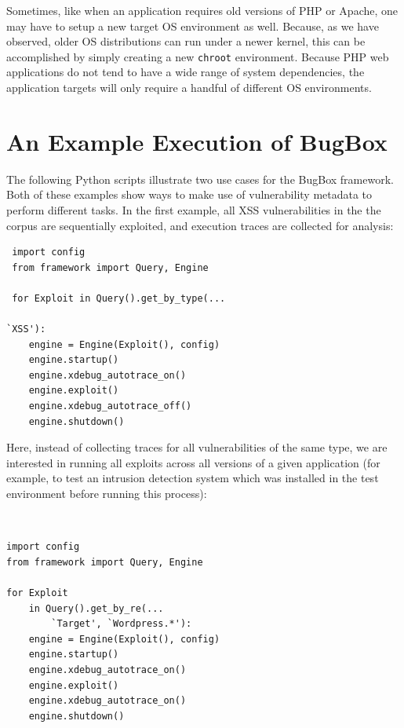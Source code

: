 \documentclass[letterpaper,twocolumn,10pt]{article}
\begin{document}
Sometimes, like when an application requires old versions of PHP or Apache, one may have to setup a new target OS environment as well. Because, as we have observed, older OS distributions can run under a newer kernel, this can be accomplished by simply creating a new \texttt{chroot} environment. Because PHP web applications do not tend to have a wide range of system dependencies, the application targets will only require a handful of different OS environments. \par

\section {An Example Execution of BugBox}

The following Python scripts illustrate two use cases for the BugBox framework. Both of these examples show ways to make use of vulnerability metadata to perform different tasks. In the first example, all XSS vulnerabilities in the the corpus are sequentially exploited, and execution traces are collected for analysis:

\begin{minipage}{\textwidth}
{\tt \footnotesize

\begin{lstlisting}
 import config
 from framework import Query, Engine
 
 for Exploit in Query().get_by_type(...
 																`XSS'):
    engine = Engine(Exploit(), config)
    engine.startup()
    engine.xdebug_autotrace_on()
    engine.exploit()
    engine.xdebug_autotrace_off()
    engine.shutdown()
\end{lstlisting}
}
\end{minipage}


Here, instead of collecting traces for all vulnerabilities of the same type, we are interested in running all exploits across all versions of a given application (for example, to test an intrusion detection system which was installed in the test environment before running this process):

\begin{minipage}{\textwidth}
{\tt \footnotesize
\begin{lstlisting}
import config
from framework import Query, Engine

for Exploit 
    in Query().get_by_re(...
        `Target', `Wordpress.*'):
    engine = Engine(Exploit(), config)
    engine.startup()
    engine.xdebug_autotrace_on()
    engine.exploit()
    engine.xdebug_autotrace_on()
    engine.shutdown()
\end{lstlisting}
}
\end{minipage}
\end{document}
